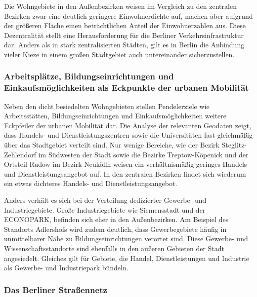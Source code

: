 
Die Wohngebiete in den Außenbezirken weisen im Vergleich zu den zentralen Bezirken zwar eine deutlich geringere Einwohnerdichte auf, machen aber aufgrund der größeren Fläche einen beträchtlichen Anteil der Einwohnerzahlen aus. Diese Dezentralität stellt eine Herausforderung für die Berliner Verkehrsinfrastruktur dar. Anders als in stark zentralisierten Städten, gilt es in Berlin die Anbindung vieler Kieze in einem großen Stadtgebiet auch untereinander sicherzustellen.

\subsubsection{Arbeitsplätze, Bildungseinrichtungen und Einkaufsmöglichkeiten als Eckpunkte der urbanen Mobilität}

Neben den dicht besiedelten Wohngebieten stellen Pendelerziele wie Arbeitsstätten, Bildungseinrichtungen und Einkaufsmöglichkeiten weitere Eckpfeiler der urbanen Mobilität dar. Die Analyse der relevanten Geodaten zeigt, dass Handels- und Dienstleistungszentren sowie die Universitäten fast gleichmäßig über das Stadtgebiet verteilt sind. Nur wenige Bereiche, wie der Bezirk Steglitz-Zehlendorf im Südwesten der Stadt sowie die Bezirke Treptow-Köpenick und der Ortsteil Rudow im Bezirk Neukölln weisen ein verhältnismäßig geringes Handels- und Dienstleistungsangebot auf. In den zentralen Bezirken findet sich wiederum ein etwas dichteres Handels- und Dienstleistungsangebot.

Anders verhält es sich bei der Verteilung dedizierter Gewerbe- und Industriegebiete. Große Industriegebiete wie Siemensstadt und der ECONOPARK, befinden sich eher in den Außenbezirken. Am Beispiel des Standorts Adlershofs wird zudem deutlich, dass Gewerbegebiete häufig in unmittelbarer Nähe zu Bildungseinrichtungen verortet sind. Diese Gewerbe- und Wissenschaftsstandorte sind ebenfalls in den äußeren Gebieten der Stadt angesiedelt. Gleiches gilt für Gebiete, die Handel, Dienstleistungen und Industrie als Gewerbe- und Industriepark bündeln.


\subsubsection{Das Berliner Straßennetz}

